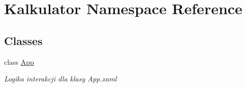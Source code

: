 \hypertarget{namespace_kalkulator}{}\section{Kalkulator Namespace Reference}
\label{namespace_kalkulator}
\subsection*{Classes}
\begin{DoxyCompactItemize}
\item 
class \mbox{\hyperlink{class_kalkulator_1_1_app}{App}}
\begin{DoxyCompactList}\small\item\em Logika interakcji dla klasy App.\+xaml \end{DoxyCompactList}\end{DoxyCompactItemize}
